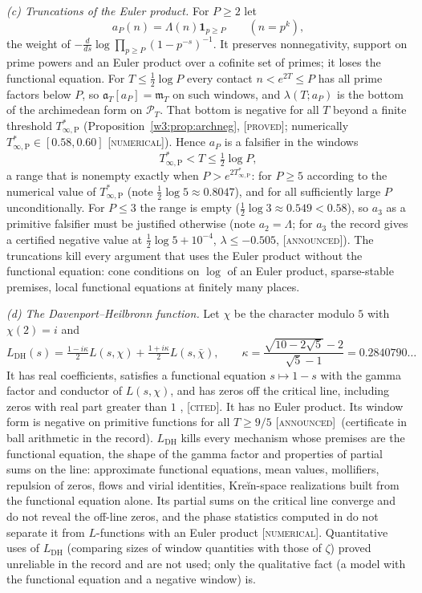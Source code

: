 \documentclass[11pt]{amsart}
\theoremstyle{definition}
\theoremstyle{remark}
\numberwithin{equation}{section}
\newcommand{\PT}{\mathcal{P}_T}                        %
\newcommand{\mT}{\mathfrak{m}_T}                       %
\newcommand{\aT}{\mathfrak{a}_T}                       %
\newcommand{\Tarch}{T^{*}_{\infty,\mathrm P}}          %
\newcommand{\stag}[1]{\textsc{[#1]}}
\newcommand{\PROVED}{\stag{proved}}
\newcommand{\CITED}{\stag{cited}}
\newcommand{\NUM}{\stag{numerical}}
\newcommand{\ANNOUNCED}{\stag{announced}}
\newcommand{\entry}[1]{\par\smallskip\noindent\textit{#1.}\enspace}
\begin{document}
\entry{(c) Truncations of the Euler product} For $P\ge2$ let
\[
  a_P(n)=\Lambda(n)\mathbf 1_{p\ge P}\qquad(n=p^k),
\]
the weight of $-\frac{d}{ds}\log\prod_{p\ge P}(1-p^{-s})^{-1}$. It preserves nonnegativity, support on prime
powers and an Euler product over a cofinite set of primes; it loses the functional equation. For
$T\le\frac12\log P$ every contact $n<e^{2T}\le P$ has all prime factors below $P$, so $\aT[a_P]=\mT$ on such
windows, and $\lambda(T;a_P)$ is the bottom of the archimedean form on $\PT$. That bottom is negative for all
$T$ beyond a finite threshold $\Tarch$ (Proposition~\ref{w3:prop:archneg}, \PROVED; numerically
$\Tarch\in[0.58,0.60]$ \NUM). Hence $a_P$ is a falsifier in the windows
\[
  \Tarch<T\le\tfrac12\log P ,
\]
a range that is nonempty exactly when $P>e^{2\Tarch}$: for $P\ge5$ according to the numerical value of
$\Tarch$ (note $\frac12\log5\approx0.8047$), and for all sufficiently large $P$ unconditionally. For $P\le3$
the range is empty ($\frac12\log3\approx0.549<0.58$), so $a_3$ as a primitive
falsifier must be justified otherwise (note $a_2=\Lambda$; for $a_3$ the record gives a certified negative value at
$\frac12\log5+10^{-4}$, $\lambda\le-0.505$, \ANNOUNCED). The truncations kill every argument that uses the
Euler product without the functional equation: cone conditions on $\log$ of an Euler product, sparse-stable
premises, local functional equations at finitely many places.

\entry{(d) The Davenport--Heilbronn function} Let $\chi$ be the character modulo $5$ with $\chi(2)=i$ and
\[
  L_{\mathrm{DH}}(s)=\tfrac{1-i\kappa}{2}L(s,\chi)+\tfrac{1+i\kappa}{2}L(s,\bar\chi),\qquad
  \kappa=\frac{\sqrt{10-2\sqrt5}-2}{\sqrt5-1}=0.2840790\ldots
\]
It has real coefficients, satisfies a functional equation $s\mapsto1-s$ with the gamma factor and conductor of
$L(s,\chi)$, and has zeros off the
critical line, including zeros with real part greater than $1$
\cite{DavenportHeilbronn1936}, \cite[\S10.25]{Titchmarsh1986} \CITED. It has no Euler product. Its window form
is negative on primitive functions for all $T\ge9/5$ \ANNOUNCED\ (certificate in ball arithmetic in the record).
$L_{\mathrm{DH}}$ kills every mechanism whose premises are the functional equation, the shape of the gamma
factor and properties of partial sums on the line: approximate functional equations, mean values, mollifiers,
repulsion of zeros, flows and virial identities, Kreĭn-space realizations built from the functional equation
alone. Its partial sums on the critical line converge and do not reveal the off-line zeros, and the phase
statistics computed in \cite{P04} do not separate it from $L$-functions with an Euler product \NUM. Quantitative uses of $L_{\mathrm{DH}}$ (comparing
sizes of window quantities with those of $\zeta$) proved unreliable in the record and are not used; only the
qualitative fact (a model with the functional equation and a negative window) is.
\end{document}
